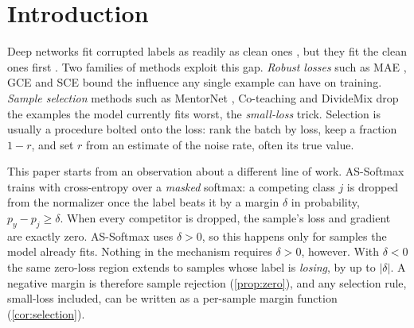 \section{Introduction}
\label{sec:intro}

Deep networks fit corrupted labels as readily as clean ones \citep{zhang2017understanding}, but
they fit the clean ones first \citep{arpit2017closer,liu2020elr}. Two families of methods exploit
this gap. \emph{Robust losses} such as MAE \citep{ghosh2017robust}, GCE \citep{zhang2018gce} and
SCE \citep{wang2019sce} bound the influence any single example can have on training. \emph{Sample selection} methods
such as MentorNet \citep{jiang2018mentornet}, Co-teaching \citep{han2018coteaching} and DivideMix
\citep{li2020dividemix} drop the examples the model currently fits worst, the \emph{small-loss} trick.
Selection is usually a procedure bolted onto the loss: rank the batch by loss, keep a fraction
$1-r$, and set $r$ from an estimate of the noise rate, often its true value.

This paper starts from an observation about a different line of work. AS-Softmax \citep{lv2023assoftmax}
trains with cross-entropy over a \emph{masked} softmax: a competing class $j$ is dropped from the
normalizer once the label beats it by a margin $\delta$ in probability, $p_y - p_j \ge \delta$. When
every competitor is dropped, the sample's loss and gradient are exactly zero. AS-Softmax uses
$\delta > 0$, so this happens only for samples the model already fits. Nothing in the mechanism
requires $\delta > 0$, however. With $\delta < 0$ the same zero-loss region extends to samples
whose label is \emph{losing}, by up to $|\delta|$. A negative margin is therefore sample
rejection (\cref{prop:zero}), and any selection rule, small-loss included, can be written as a
per-sample margin function (\cref{cor:selection}).

